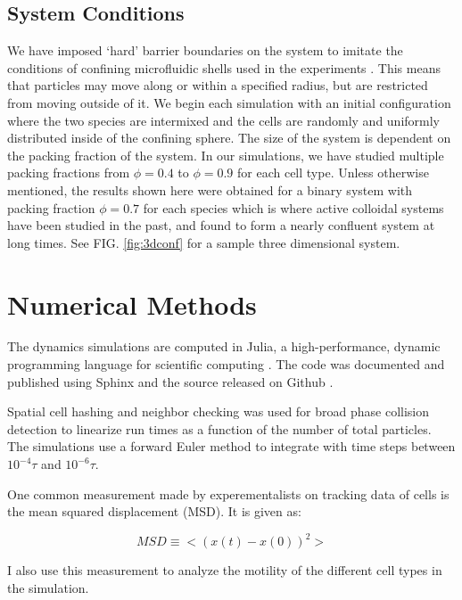 \documentclass[aps,prb,twocolumn,groupedaddress,nofootinbib,floatfix]{revtex4}
\begin{document}

\subsection{System Conditions}
We have imposed `hard' barrier boundaries on the system to imitate the conditions of confining microfluidic shells used in the experiments \cite{Mingming}. 
This means that particles may move along or within a specified radius, but are restricted from moving outside of it. We begin each simulation with an initial configuration 
where the two species are intermixed and the cells are randomly and uniformly distributed inside of the confining sphere. The size of the system is dependent on the 
packing fraction of the system. In our simulations, we have studied multiple packing fractions from $\phi=0.4$ to $\phi=0.9$ for each cell type. Unless otherwise mentioned, the results shown here were obtained
for a binary system with packing fraction $\phi=0.7$ for each species which is where active colloidal systems have been studied in the past\cite{RednerBaskaran}, and found to form a nearly confluent system at long times. 
See FIG. \ref{fig:3dconf} for a sample three dimensional system.


\section{Numerical Methods}

The dynamics simulations are computed in Julia, a high-performance, dynamic 
programming language for scientific computing \cite{Bezanson1,Bezanson2}.
The code was documented and published using Sphinx \cite{RTD} and the source released on Github \cite{github}.

Spatial cell hashing and neighbor checking was used for broad phase collision detection to linearize run times 
as a function of the number of total particles. The simulations use a forward 
Euler method to integrate with time steps between $10^{-4}\tau$ and $10^{-6}\tau$.

One common measurement made by experementalists on tracking data of cells is the mean squared displacement (MSD).
It is given as:

\begin{equation}
  MSD \equiv <(x(t) - x(0))^2>
\end{equation}

I also use this measurement to analyze the motility of the different cell types in the simulation.
\end{document}
